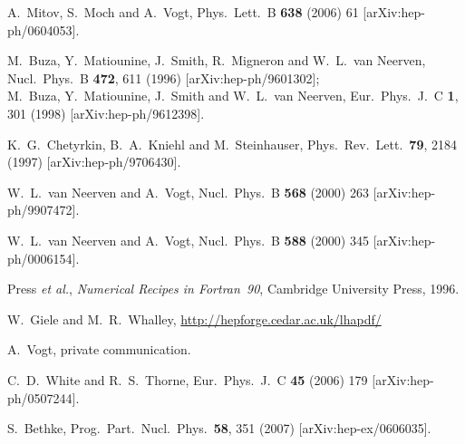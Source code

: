 \documentclass[12pt]{article}
\begin{document}
\begin{thebibliography}{99}
  A.~Mitov, S.~Moch and A.~Vogt,
  Phys.\ Lett.\  B {\bf 638} (2006) 61
  [arXiv:hep-ph/0604053].


  M.~Buza, Y.~Matiounine, J.~Smith, R.~Migneron and W.~L.~van Neerven,
  Nucl.\ Phys.\ B {\bf 472}, 611 (1996)
  [arXiv:hep-ph/9601302];\\
%
  M.~Buza, Y.~Matiounine, J.~Smith and W.~L.~van Neerven,
  Eur.\ Phys.\ J.\ C {\bf 1}, 301 (1998)
  [arXiv:hep-ph/9612398].

  K.~G.~Chetyrkin, B.~A.~Kniehl and M.~Steinhauser,
  Phys.\ Rev.\ Lett.\  {\bf 79}, 2184 (1997)
  [arXiv:hep-ph/9706430].

  W.~L.~van Neerven and A.~Vogt,
  Nucl.\ Phys.\ B {\bf 568} (2000) 263
  [arXiv:hep-ph/9907472].

  W.~L.~van Neerven and A.~Vogt,
  Nucl.\ Phys.\ B {\bf 588} (2000) 345
  [arXiv:hep-ph/0006154].

  Press {\it et al.}, \emph{Numerical Recipes in Fortran~90},
  Cambridge University Press, 1996.

 W.~Giele and M.~R.~Whalley,
\url{http://hepforge.cedar.ac.uk/lhapdf/}
  
 A.~Vogt, private communication.


  C.~D.~White and R.~S.~Thorne,
  Eur.\ Phys.\ J.\ C {\bf 45} (2006) 179
  [arXiv:hep-ph/0507244].

  S.~Bethke,
  Prog.\ Part.\ Nucl.\ Phys.\  {\bf 58}, 351 (2007)
  [arXiv:hep-ex/0606035].


\end{thebibliography}
\end{document}
